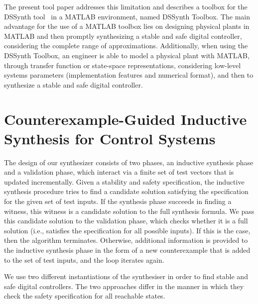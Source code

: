 \documentclass[10pt,conference]{IEEEtran}
\newcommand\tool{{DSSynth Toolbox}\xspace}
\begin{document}
The present tool paper addresses this limitation and describes a toolbox for the DSSynth tool~\cite{abate2017, abatecav2017} 
in a MATLAB environment, named \tool. The main advantage for the use of a MATLAB toolbox 
lies on designing physical plants in MATLAB and then promptly synthesizing a stable and safe digital controller,
considering the complete range of approximations. 
Additionally, when using the \tool, an engineer is able to model a physical plant with MATLAB, 
through transfer function or state-space representations, considering low-level systems parameters 
(implementation features and numerical format), and then to synthesize a stable and safe digital controller.

\section{Counterexample-Guided Inductive Synthesis for Control Systems}



The design of our synthesizer consists of two phases, an inductive
synthesis phase and a validation phase, which interact via a finite
set of test vectors that is updated incrementally.  Given a stability
and safety specification, the inductive synthesis procedure tries to
find a candidate solution satisfying the specification for the given set of test inputs.
%
If the synthesis phase succeeds in finding a witness, this witness is
a candidate solution to the full synthesis formula.  We pass this
candidate solution to the validation phase, which checks whether it is
a full solution (i.e., satisfies the specification for all possible
inputs).  If this is the case, then the algorithm terminates.
Otherwise, additional information is provided to the inductive
synthesis phase in the form of a new counterexample that is added to
the set of test inputs, and the loop iterates again.

We use two different instantiations of the synthesiser
in order to find stable and safe digital
controllers. The two approaches differ in
the manner in which they check the safety specification
for all reachable states.
\end{document}
